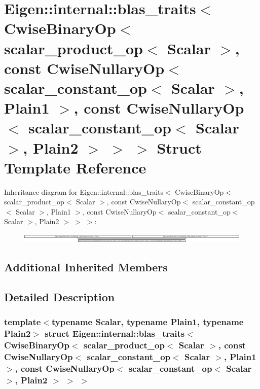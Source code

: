 \hypertarget{struct_eigen_1_1internal_1_1blas__traits_3_01_cwise_binary_op_3_01scalar__product__op_3_01_scala720e6aa72051d527ea4818c5301d9b21}{}\section{Eigen\+:\+:internal\+:\+:blas\+\_\+traits$<$ Cwise\+Binary\+Op$<$ scalar\+\_\+product\+\_\+op$<$ Scalar $>$, const Cwise\+Nullary\+Op$<$ scalar\+\_\+constant\+\_\+op$<$ Scalar $>$, Plain1 $>$, const Cwise\+Nullary\+Op$<$ scalar\+\_\+constant\+\_\+op$<$ Scalar $>$, Plain2 $>$ $>$ $>$ Struct Template Reference}
\label{struct_eigen_1_1internal_1_1blas__traits_3_01_cwise_binary_op_3_01scalar__product__op_3_01_scala720e6aa72051d527ea4818c5301d9b21}
Inheritance diagram for Eigen\+:\+:internal\+:\+:blas\+\_\+traits$<$ Cwise\+Binary\+Op$<$ scalar\+\_\+product\+\_\+op$<$ Scalar $>$, const Cwise\+Nullary\+Op$<$ scalar\+\_\+constant\+\_\+op$<$ Scalar $>$, Plain1 $>$, const Cwise\+Nullary\+Op$<$ scalar\+\_\+constant\+\_\+op$<$ Scalar $>$, Plain2 $>$ $>$ $>$\+:\begin{figure}[H]
\begin{center}
\leavevmode
\includegraphics[height=0.460526cm]{struct_eigen_1_1internal_1_1blas__traits_3_01_cwise_binary_op_3_01scalar__product__op_3_01_scala720e6aa72051d527ea4818c5301d9b21}
\end{center}
\end{figure}
\subsection*{Additional Inherited Members}


\subsection{Detailed Description}
\subsubsection*{template$<$typename Scalar, typename Plain1, typename Plain2$>$\newline
struct Eigen\+::internal\+::blas\+\_\+traits$<$ Cwise\+Binary\+Op$<$ scalar\+\_\+product\+\_\+op$<$ Scalar $>$, const Cwise\+Nullary\+Op$<$ scalar\+\_\+constant\+\_\+op$<$ Scalar $>$, Plain1 $>$, const Cwise\+Nullary\+Op$<$ scalar\+\_\+constant\+\_\+op$<$ Scalar $>$, Plain2 $>$ $>$ $>$}



